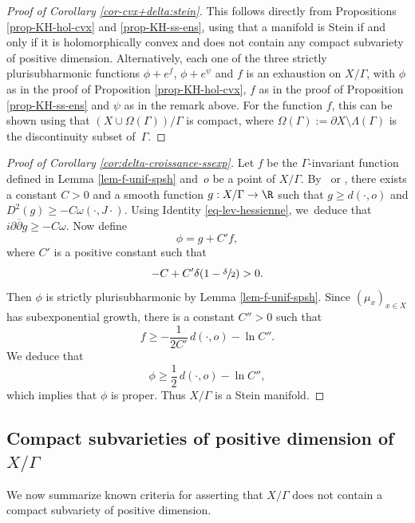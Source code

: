 \begin{proof}[Proof of Corollary \ref{cor-cvx+delta:stein}]
This follows directly from Propositions \ref{prop-KH-hol-cvx} and \ref{prop-KH-ss-ens}, using that a manifold is Stein if and only if it is holomorphically convex and does not contain any compact subvariety of positive dimension. Alternatively, each one of the three strictly plurisubharmonic functions $\phi+e^{f}$, $\phi+e^{\psi}$ and $f$ is an exhaustion on $X/\Gamma$, with $\phi$ as in the proof of Proposition \ref{prop-KH-hol-cvx}, $f$ as in the proof of Proposition \ref{prop-KH-ss-ens} and $\psi$ as in the remark above. For the function $f$, this can be shown using that $(X\cup\Omega(\Gamma))/\Gamma$ is compact, where $\Omega(\Gamma):= \partial X\setminus \Lambda(\Gamma)$ is the discontinuity subset of~$\Gamma$.
\end{proof}

\begin{proof}[Proof of Corollary \ref{cor:delta-croissance-ssexp}]
Let $f$ be the $\Gamma$\nobreakdash-invariant function defined in Lemma \ref{lem-f-unif-spsh} and~$o$ be a point of $X/\Gamma$. By~\cite{tamExhaustionFunctionsComplete2010} or \cite[\S4 of Ch.\,26]{chowRicciFlowTechniques2010}, there exists a constant $C>0$ and a smooth function $g:X/\Gamma \to \R$ such that $g\ge d(\cdot,o)$ and \hbox{$D^{2}(g)\ge -C\omega(\cdot,J\cdot)$}. Using Identity \eqref{eq-lev-hessienne}, we~deduce that $i\partial\overline{\partial}g\ge -C\omega$. Now define
\begin{equation*}
\phi = g + C'f,
\end{equation*}
where $C'$ is a positive constant such that
\begin{equation*}
-C+C'\delta(1-\sfrac{\delta}{2})>0.
\end{equation*}
Then $\phi$ is strictly plurisubharmonic by Lemma \ref{lem-f-unif-spsh}. Since $(\mu_x)_{x\in X}$ has subexponential growth, there is a constant $C''>0$ such that
\begin{equation*}
f\ge -\frac{1}{2C'}\,d(\cdot,o) -\ln C''.
\end{equation*}
We deduce that
\begin{equation*}
\phi \ge \frac{1}{2}\,d(\cdot,o) -\ln C'',
\end{equation*}
which implies that $\phi$ is proper. Thus $X/\Gamma$ is a Stein manifold.
\end{proof}

\subsection{Compact subvarieties of positive dimension of $X/\Gamma$}\label{ss-section-criteres}
We now summarize known criteria for asserting that $X/\Gamma$ does not contain a compact subvariety of positive dimension.

